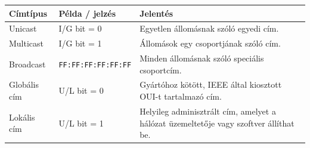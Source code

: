 
\begin{tabularx}{\textwidth}{L{25mm}L{42mm}X}
\toprule
\textbf{Címtípus} & \textbf{Példa / jelzés} & \textbf{Jelentés} \\
\midrule
Unicast & I/G bit = 0 & Egyetlen állomásnak szóló egyedi cím. \\
Multicast & I/G bit = 1 & Állomások egy csoportjának szóló cím. \\
Broadcast & \texttt{\scriptsize FF:FF:FF:FF:FF:FF} & Minden állomásnak szóló speciális csoportcím. \\
Globális cím & U/L bit = 0 & Gyártóhoz kötött, IEEE által kiosztott OUI-t tartalmazó cím. \\
Lokális cím & U/L bit = 1 & Helyileg adminisztrált cím, amelyet a hálózat üzemeltetője vagy szoftver állíthat be. \\
\bottomrule
\end{tabularx}
